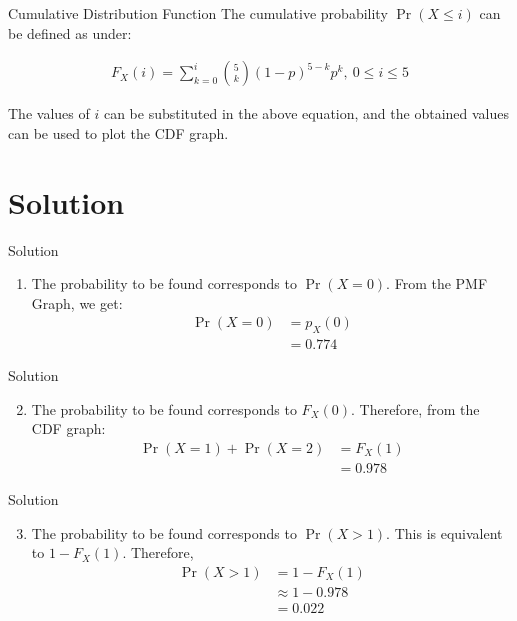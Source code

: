 \documentclass{beamer}
\providecommand{\pr}[1]{\ensuremath{\Pr\left(#1\right)}}
\begin{document}
\begin{frame}{Cumulative Distribution Function}
The cumulative probability $ \pr{X \leq i}$ can be defined as under:

\begin{block}{}
\begin{align}
          \label{eq2}
       F_{X}(i) = \sum_{k=0}^{i} \binom{5}{k} (1-p)^{5-k} p^k ,~ 0 \le i \le 5
\end{align}
\end{block}

The values of $i$ can be substituted in the above equation, and the obtained values can be used to plot the CDF graph.

\end{frame}


\section{Solution}
\begin{frame}{Solution}
\begin{enumerate}[label=(\roman*)]
  \setcounter{enumi}{0}
\item The probability to be found corresponds to $\pr{X=0}$. From the PMF Graph, we get:
\begin{align}
    \pr{X=0} &= p_X(0) \\
             &=0.774 
             \label{eq5}
\end{align}
\end{enumerate}
\end{frame}

\begin{frame}{Solution}
\begin{enumerate}[label=(\roman*)]
  \setcounter{enumi}{1}
\item The probability to be found corresponds to $F_X(0)$. Therefore, from the CDF graph:
\begin{align}
    \pr{X=1}+\pr{X=2} &=F_X(1) \\
             &= 0.978
\end{align}
\end{enumerate}
\end{frame}


\begin{frame}{Solution}
\begin{enumerate}[label=(\roman*)]
  \setcounter{enumi}{2}
\item The probability to be found corresponds to $\pr{X>1}$. This is equivalent to $1-F_X(1)$. Therefore, 
\begin{align}
    \pr{X>1} &= 1-F_X(1) \\
             &\approx 1-0.978 \\
             &= 0.022 
\end{align}

\end{enumerate}
\end{frame}
\end{document}
